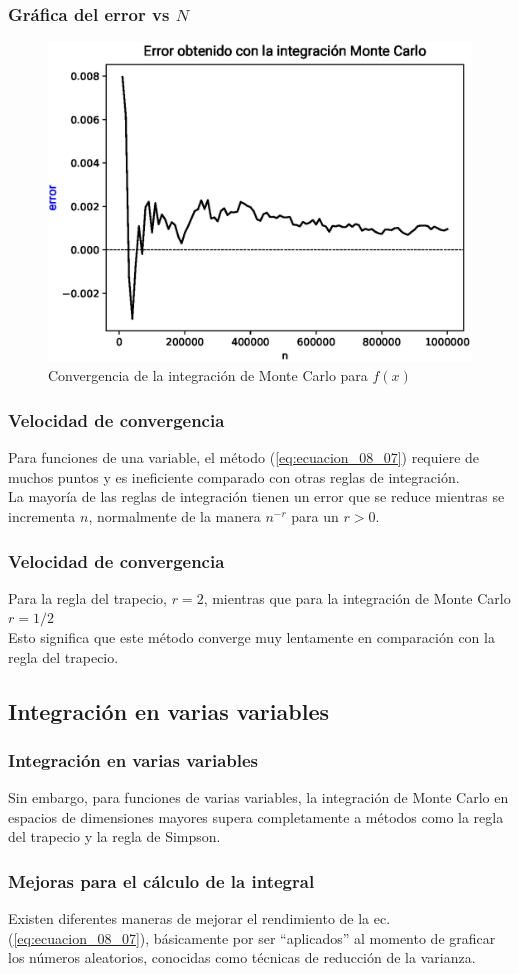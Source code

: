 \documentclass[12pt]{beamer}
\begin{document}
\begin{frame}[fragile]
\frametitle{Gráfica del error vs $N$}
\begin{figure}
	\centering
	\includegraphics[scale=0.55]{Imagenes/integracionMC01_2017.eps}
	\caption{Convergencia de la integración de Monte Carlo para $f(x)$}
\end{figure}
\end{frame}
\begin{frame}
\frametitle{Velocidad de convergencia}
Para funciones de una variable, el método (\ref{eq:ecuacion_08_07}) requiere de muchos puntos y es ineficiente comparado con otras reglas de integración.
\\
\bigskip
\pause 
La mayoría de las reglas de integración tienen un error que se reduce mientras se incrementa $n$, normalmente de la manera $n^{-r}$ para un $r>0$.
\end{frame}
\begin{frame}
\frametitle{Velocidad de convergencia}
Para la regla del trapecio, $r = 2$, mientras que para la integración de Monte Carlo $r = 1/2$
\\
\bigskip
Esto significa que este método converge muy lentamente en comparación con la regla del trapecio.
\end{frame}

\subsection{Integración en varias variables}

\begin{frame}
\frametitle{Integración en varias variables}
Sin embargo, para funciones de varias variables, la integración de Monte Carlo en espacios de dimensiones mayores supera completamente a métodos como la regla del trapecio y la regla de Simpson.
\end{frame}
\begin{frame}
\frametitle{Mejoras para el cálculo de la integral}
Existen diferentes maneras de mejorar el rendimiento de la ec. (\ref{eq:ecuacion_08_07}), básicamente por ser \enquote{aplicados} al momento de graficar los números aleatorios, conocidas como técnicas de reducción de la varianza.
\end{frame}
\end{document}
